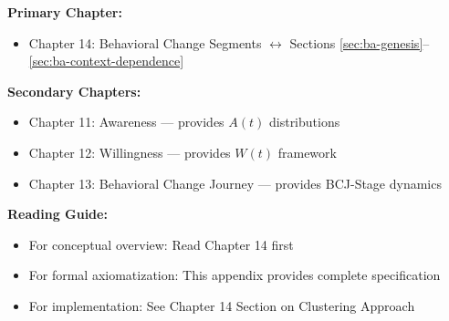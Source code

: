 
\begin{tcolorbox}[colback=purple!5!white, colframe=purple!75!black,
    title=Chapter Linkage]

\textbf{Primary Chapter:}
\begin{itemize}[nosep]
\item Chapter 14: Behavioral Change Segments $\leftrightarrow$ Sections \ref{sec:ba-genesis}--\ref{sec:ba-context-dependence}
\end{itemize}

\textbf{Secondary Chapters:}
\begin{itemize}[nosep]
\item Chapter 11: Awareness --- provides $A(t)$ distributions
\item Chapter 12: Willingness --- provides $W(t)$ framework
\item Chapter 13: Behavioral Change Journey --- provides BCJ-Stage dynamics
\end{itemize}

\textbf{Reading Guide:}
\begin{itemize}[nosep]
\item For conceptual overview: Read Chapter 14 first
\item For formal axiomatization: This appendix provides complete specification
\item For implementation: See Chapter 14 Section on Clustering Approach
\end{itemize}

\end{tcolorbox}


\begin{abstract}
This appendix provides formal axiomatization of behavioral segment emergence.
Rather than positing fixed archetypal segments, we show how segments naturally
emerge as clusters in the multidimensional space of utility weights ($\omega_i$),
awareness ($A_i$), willingness ($W_i$), and context ($\Psi$). The fundamental
mechanism is universal: heterogeneity in individual preferences and decision
processes creates natural clustering. However, the number, type, and size of
clusters are context-dependent and domain-specific. This framework explains why
some domains show 3-4 natural segments while others show 6-7. The formalization
is based on 6 core axioms governing segment emergence, plus 5 propositions about
cluster stability, transitions, and context modulation.
\end{abstract}

